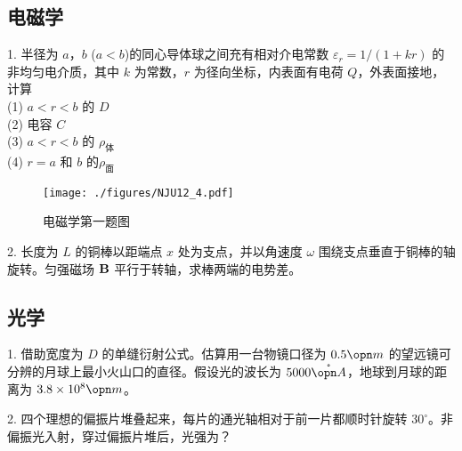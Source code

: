 \subsection{电磁学}
1. 半径为 $a$，$b$ ($a<b$)的同心导体球之间充有相对介电常数 $\varepsilon_r=1/(1+kr)$ 的非均匀电介质，其中 $k$ 为常数，$r$ 为径向坐标，内表面有电荷 $Q$，外表面接地，计算\\
(1) $ a<r<b $ 的 $D$\\
(2) 电容 $C$\\
(3) $ a<r<b $ 的 $\rho_{\text{体}}$\\
(4) $ r=a $ 和 $b$ 的$\rho_{\text{面}}$
\begin{figure}[ht]
\centering
\texttt{[image: ./figures/NJU12\_4.pdf]}
\caption{电磁学第一题图} \label{NJU12_fig4}
\end{figure}
2. 长度为 $L$ 的铜棒以距端点 $x$ 处为支点，并以角速度 $\omega$ 围绕支点垂直于铜棒的轴旋转。匀强磁场 $\bf B$ 平行于转轴，求棒两端的电势差。
\subsection{光学}
1. 借助宽度为 $D$ 的单缝衍射公式。估算用一台物镜口径为 $0.5 \opn m$ 的望远镜可分辨的月球上最小火山口的直径。假设光的波长为 $5000\mathring{\opn A}$，地球到月球的距离为 $3.8\times 10^8 \opn m$。

2. 四个理想的偏振片堆叠起来，每片的通光轴相对于前一片都顺时针旋转 $30^\circ$。非偏振光入射，穿过偏振片堆后，光强为？
